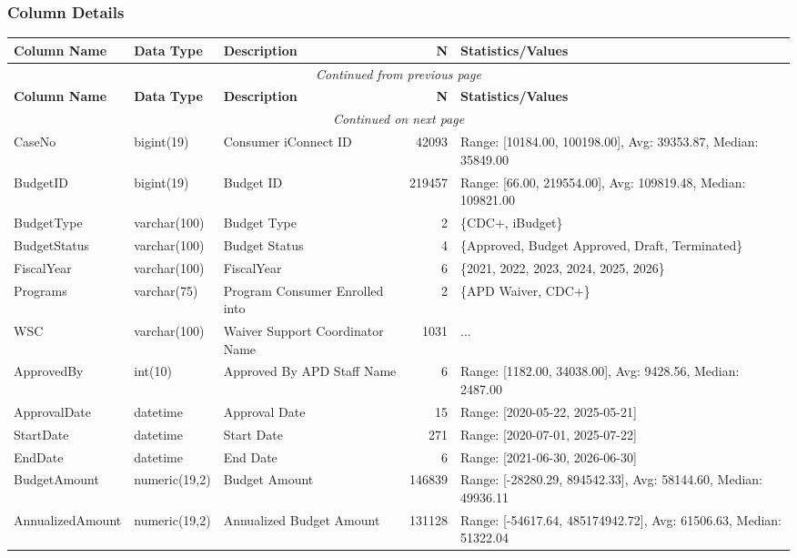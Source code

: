 \begin{landscape}
\subsubsection{Column Details}
\begin{longtable}{|l|l|l|r|p{6cm}|}
\hline
\textbf{Column Name} & \textbf{Data Type} & \textbf{Description} & \textbf{N} & \textbf{Statistics/Values} \\
\hline
\endfirsthead
\multicolumn{5}{c}{\textit{Continued from previous page}} \\
\hline
\textbf{Column Name} & \textbf{Data Type} & \textbf{Description} & \textbf{N} & \textbf{Statistics/Values} \\
\hline
\endhead
\hline
\multicolumn{5}{c}{\textit{Continued on next page}} \\
\endfoot
\hline
\endlastfoot
CaseNo & bigint(19) & Consumer iConnect ID & 42093 & Range: [10184.00, 100198.00], Avg: 39353.87, Median: 35849.00 \\
\hline
BudgetID & bigint(19) & Budget ID & 219457 & Range: [66.00, 219554.00], Avg: 109819.48, Median: 109821.00 \\
\hline
BudgetType & varchar(100) & Budget Type & 2 & \{CDC+, iBudget\} \\
\hline
BudgetStatus & varchar(100) & Budget Status & 4 & \{Approved, Budget Approved, Draft, Terminated\} \\
\hline
FiscalYear & varchar(100) & FiscalYear & 6 & \{2021, 2022, 2023, 2024, 2025, 2026\} \\
\hline
Programs & varchar(75) & Program Consumer Enrolled into & 2 & \{APD Waiver, CDC+\} \\
\hline
WSC & varchar(100) & Waiver Support Coordinator Name & 1031 & ... \\
\hline
ApprovedBy & int(10) & Approved By APD Staff Name & 6 & Range: [1182.00, 34038.00], Avg: 9428.56, Median: 2487.00 \\
\hline
ApprovalDate & datetime & Approval Date & 15 & Range: [2020-05-22, 2025-05-21] \\
\hline
StartDate & datetime & Start Date & 271 & Range: [2020-07-01, 2025-07-22] \\
\hline
EndDate & datetime & End Date & 6 & Range: [2021-06-30, 2026-06-30] \\
\hline
BudgetAmount & numeric(19,2) & Budget Amount & 146839 & Range: [-28280.29, 894542.33], Avg: 58144.60, Median: 49936.11 \\
\hline
AnnualizedAmount & numeric(19,2) & Annualized Budget Amount & 131128 & Range: [-54617.64, 485174942.72], Avg: 61506.63, Median: 51322.04 \\

\end{longtable}
\end{landscape}
